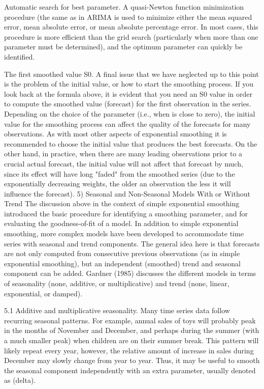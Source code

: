 Automatic search for best parameter. A quasi-Newton function minimization procedure (the same as in ARIMA is used to minimize either the mean squared error, mean absolute error, or 
mean absolute percentage error. In most cases, this procedure is more efficient than the grid search (particularly when more than one parameter must be determined), and the optimum  parameter can quickly be identified.

The first smoothed value S0. A final issue that we have neglected up to this point is the problem of the initial value, or how to start the smoothing process. If you look back at the formula above, it is evident that you need an S0 value in order to compute the smoothed value (forecast) for the first observation in the series. Depending on the choice of the  parameter (i.e., when  is close to zero), the initial value for the smoothing process can affect the quality of the forecasts for many observations. As with most other aspects of exponential smoothing it is recommended to choose the initial value that produces the best forecasts. On the other hand, in practice, when there are many leading observations prior to a crucial actual forecast, the initial value will not affect that forecast by much, since its effect will have long "faded" from the smoothed series (due to the exponentially decreasing weights, the older an observation the less it will influence the forecast).
5) Seasonal and Non-Seasonal Models With or Without Trend
The discussion above in the context of simple exponential smoothing introduced the basic procedure for identifying a smoothing parameter, and for evaluating the goodness-of-fit of a model. In addition to simple exponential smoothing, more complex models have been developed to accommodate time series with seasonal and trend components. The general idea here is that forecasts are not only computed from consecutive previous observations (as in simple exponential smoothing), but an independent (smoothed) trend and seasonal component can be added. Gardner (1985) discusses the different models in terms of seasonality (none, additive, or multiplicative) and trend (none, linear, exponential, or damped).

5.1 Additive and multiplicative seasonality. Many time series data follow recurring seasonal patterns. For example, annual sales of toys will probably peak in the months of November and December, and perhaps during the summer (with a much smaller peak) when children are on their summer break. This pattern will likely repeat every year, however, the relative amount of increase in sales during December may slowly change from year to year. Thus, it may be useful to smooth the seasonal component independently with an extra parameter, usually denoted as  (delta).

